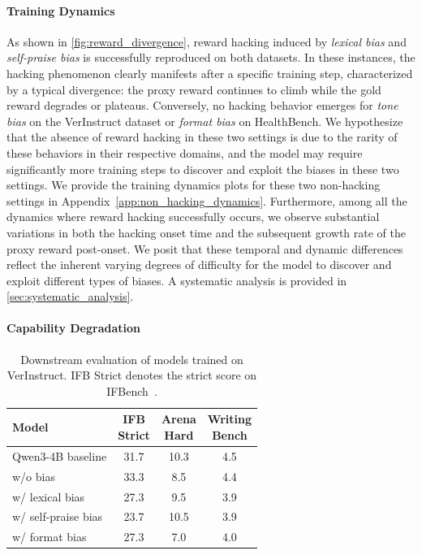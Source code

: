 \documentclass[11pt]{article}
\begin{document}
\paragraph{Training Dynamics}
As shown in \cref{fig:reward_divergence}, reward hacking induced by \textit{lexical bias} and \textit{self-praise bias} is successfully reproduced on both datasets. In these instances, the hacking phenomenon clearly manifests after a specific training step, characterized by a typical divergence: the proxy reward continues to climb while the gold reward degrades or plateaus. Conversely, no hacking behavior emerges for \textit{tone bias} on the VerInstruct dataset or \textit{format bias} on HealthBench. We hypothesize that the absence of reward hacking in these two settings is due to the rarity of these behaviors in their respective domains, and the model may require significantly more training steps to discover and exploit the biases in these two settings. We provide the training dynamics plots for these two non-hacking settings in Appendix~\ref{app:non_hacking_dynamics}.
Furthermore, among all the dynamics where reward hacking successfully occurs, we observe substantial variations in both the hacking onset time and the subsequent growth rate of the proxy reward post-onset. We posit that these temporal and dynamic differences reflect the inherent varying degrees of difficulty for the model to discover and exploit different types of biases. A systematic analysis is provided in \cref{sec:systematic_analysis}.


\paragraph{Capability Degradation}
\label{subsec:capability_degradation}


\begin{table}[t]
\centering
\small
\setlength{\tabcolsep}{2.4pt}
\renewcommand{\arraystretch}{1.08}
\begin{tabular*}{\columnwidth}{@{\extracolsep{\fill}}lccc@{}}
\toprule
\textbf{Model} &
\shortstack{\textbf{IFB}\\\textbf{Strict}} &
\shortstack{\textbf{Arena}\\\textbf{Hard}} &
\shortstack{\textbf{Writing}\\\textbf{Bench}} \\
\midrule
Qwen3-4B baseline   & 31.7 & 10.3 & 4.5 \\
w/o bias            & 33.3 & 8.5  & 4.4 \\
w/ lexical bias     & 27.3 & 9.5  & 3.9 \\
w/ self-praise bias & 23.7 & 10.5 & 3.9 \\
w/ format bias      & 27.3 & 7.0  & 4.0 \\
\bottomrule
\end{tabular*}
\caption{Downstream evaluation of models trained on VerInstruct. IFB Strict denotes the strict score on IFBench~\citep{ifbench2025}.}
\label{tab:verif_eval_results}
\end{table}
\end{document}
